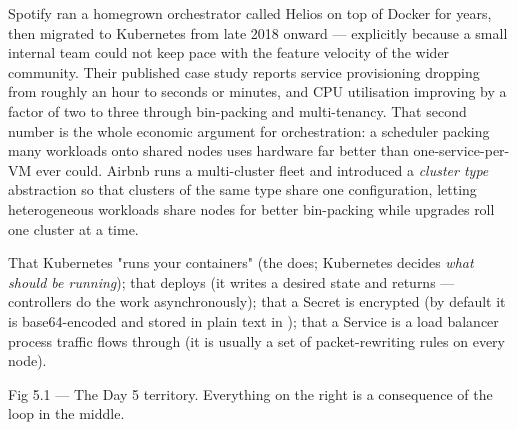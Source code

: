  Spotify ran a homegrown orchestrator called Helios on top of Docker for years, then migrated to Kubernetes from late 2018 onward --- explicitly because a small internal team could not keep pace with the feature velocity of the wider community. Their published case study reports service provisioning dropping from roughly an hour to seconds or minutes, and CPU utilisation improving by a factor of two to three through bin-packing and multi-tenancy. That second number is the whole economic argument for orchestration: a scheduler packing many workloads onto shared nodes uses hardware far better than one-service-per-VM ever could. Airbnb runs a multi-cluster fleet and introduced a \emph{cluster type} abstraction so that clusters of the same type share one configuration, letting heterogeneous workloads share nodes for better bin-packing while upgrades roll one cluster at a time.

 That Kubernetes "runs your containers" (the  does; Kubernetes decides \emph{what should be running}); that  deploys (it writes a desired state and returns --- controllers do the work asynchronously); that a Secret is encrypted (by default it is base64-encoded and stored in plain text in ); that a Service is a load balancer process traffic flows through (it is usually a set of packet-rewriting rules on every node).


\begin{wbfigure}{Fig 5.1 — The Day 5 territory. Everything on the right is a consequence of the loop in the middle.}
\end{wbfigure}

